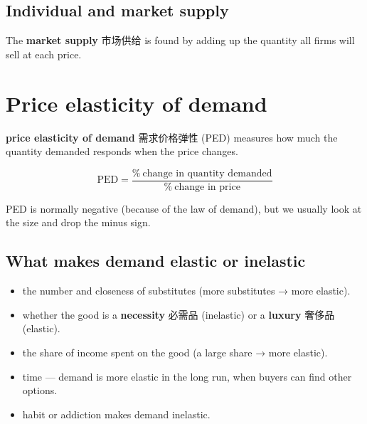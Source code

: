 \documentclass[11pt]{article}
\begin{document}
\subsection*{Individual and market supply}

The \textbf{market supply} 市场供给 is found by adding up the quantity all firms will sell at each price.

\section*{Price elasticity of demand}

\textbf{price elasticity of demand} 需求价格弹性 (PED) measures how much the quantity demanded responds when the price changes.

\[
\text{PED} = \frac{\%\ \text{change in quantity demanded}}{\%\ \text{change in price}}
\]

PED is normally negative (because of the law of demand), but we usually look at the size and drop the minus sign.

\begin{center}
\end{center}

\subsection*{What makes demand elastic or inelastic}

\begin{itemize}
\item the number and closeness of substitutes (more substitutes → more elastic).

\item whether the good is a \textbf{necessity} 必需品 (inelastic) or a \textbf{luxury} 奢侈品 (elastic).

\item the share of income spent on the good (a large share → more elastic).

\item time — demand is more elastic in the long run, when buyers can find other options.

\item habit or addiction makes demand inelastic.

\end{itemize}
\end{document}

